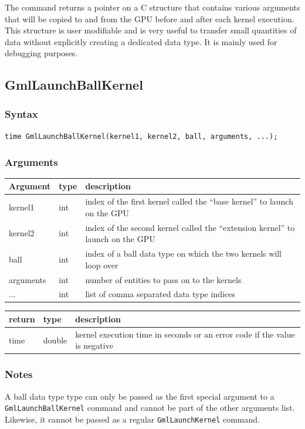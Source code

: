 \documentclass[a4paper,12pt]{article}
\begin{document}
The command returns a pointer on a C structure that contains various arguments that will be copied to and from the GPU before and after each kernel execution. This structure is user modifiable and is very useful to transfer small quantities of data without explicitly creating a dedicated data type. It is mainly used for debugging purposes.

\subsection{GmlLaunchBallKernel}
\subsubsection*{Syntax}
{\tt time GmlLaunchBallKernel(kernel1, kernel2, ball, arguments, ...);}
\subsubsection*{Arguments}

\begin{tabular}{|m{2cm}|m{1.5cm}|m{10.5cm}|}
\hline
Argument   & type   & description \\
\hline
kernel1    & int   & index of the first kernel called the ``base kernel'' to launch on the GPU \\
\hline
kernel2    & int   & index of the second kernel called the ``extension kernel'' to launch on the GPU \\
\hline
ball       & int   & index of a ball data type on which the two kernels will loop over \\
\hline
arguments  & int   & number of entities to pass on to the kernels \\
\hline
...        & int   & list of comma separated data type indices \\
\hline
\end{tabular}

\medskip

\begin{tabular}{|m{2cm}|m{1.5cm}|m{10.5cm}|}
\hline
return     & type   & description \\
\hline
time       & double & kernel execution time in seconds or an error code if the value is negative \\
\hline
\end{tabular}
 
\subsubsection*{Notes}
A ball data type type can only be passed as the first special argument to a {\tt GmlLaunchBallKernel} command and cannot be part of the other arguments list. Likewise, it cannot be passed as a regular {\tt GmlLaunchKernel} command.
\end{document}
